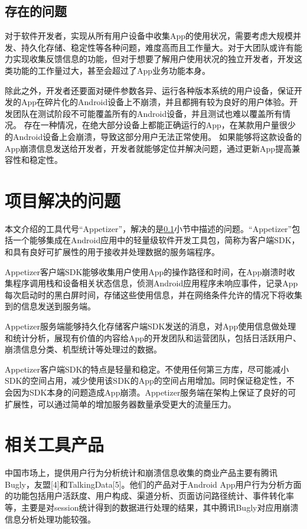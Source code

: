 \subsection{存在的问题}
\label{subsec:exist_problem}

对于软件开发者，实现从所有用户设备中收集App的使用状况，需要考虑大规模并发、持久化存储、稳定性等各种问题，难度高而且工作量大。对于大团队或许有能力实现收集反馈信息的功能，但对于想要了解用户使用状况的独立开发者，开发这类功能的工作量过大，甚至会超过了App业务功能本身。

除此之外，开发者还要面对硬件参数各异、运行各种版本系统的用户设备，保证开发的App在碎片化的Android设备上不崩溃，并且都拥有较为良好的用户体验。开发团队在测试阶段不可能覆盖所有的Android设备，并且测试也难以覆盖所有情况。
存在一种情况，在绝大部分设备上都能正确运行的App，在某款用户量很少的Android设备上会崩溃，导致这部分用户无法正常使用。
如果能够将这款设备的App崩溃信息发送给开发者，开发者就能够定位并解决问题，通过更新App提高兼容性和稳定性。

\section{项目解决的问题}
\label{sec:solve_problem}

本文介绍的工具代号“Appetizer”，解决的是\ref{subsec:exist_problem}小节中描述的问题。“Appetizer”包括一个能够集成在Android应用中的轻量级软件开发工具包，简称为客户端SDK，和具有良好可扩展性的用于接收并处理数据的服务端程序。

Appetizer客户端SDK能够收集用户使用App的操作路径和时间，在App崩溃时收集程序调用栈和设备相关状态信息，侦测Android应用程序未响应事件，记录App每次启动时的黑白屏时间，存储这些使用信息，并在网络条件允许的情况下将收集到的信息发送到服务端。

Appetizer服务端能够持久化存储客户端SDK发送的消息，对App使用信息做处理和统计分析，展现有价值的内容给App的开发团队和运营团队，包括日活跃用户、崩溃信息分类、机型统计等处理过的数据。

Appetizer客户端SDK的特点是轻量和稳定。不使用任何第三方库，尽可能减小SDK的空间占用，减少使用该SDK的App的空间占用增加。同时保证稳定性，不会因为SDK本身的问题造成App崩溃。Appetizer服务端在架构上保证了良好的可扩展性，可以通过简单的增加服务器数量承受更大的流量压力。

\section{相关工具产品}
\label{sec:related_work}

中国市场上，提供用户行为分析统计和崩溃信息收集的商业产品主要有腾讯Bugly，友盟[4]和TalkingData[5]。他们的产品对于Android App用户行为分析方面的功能包括用户活跃度、用户构成、渠道分析、页面访问路径统计、事件转化率等，主要是对session统计得到的数据进行处理的结果，其中腾讯Bugly对应用崩溃信息分析处理功能较强。

